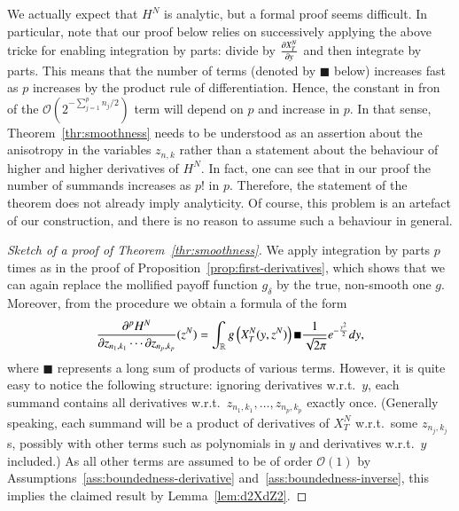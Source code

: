 \documentclass{amsart}
\begin{document}
\begin{remark}
  \label{rem:analyticity}
  We actually expect that $H^N$ is analytic, but a formal proof seems
  difficult. In particular, note that our proof below relies on successively
  applying the above tricke for enabling integration by parts: divide by
  $\frac{\partial X^N_T}{\partial y}$ and then integrate by parts. This means that the
  number of terms (denoted by $\blacksquare$ below) increases fast as $p$
  increases by the product rule of differentiation. Hence, the constant in
  fron of the $\mathcal{O}\left( 2^{-\sum_{j=1}^p n_j/2} \right)$ term will
  depend on $p$ and increase in $p$. In that sense,
  Theorem~\ref{thr:smoothness} needs to be understood as an assertion about
  the anisotropy in the variables $z_{n,k}$ rather than a statement about the
  behaviour of higher and higher derivatives of $H^N$. In fact, one can see
  that in our proof the number of summands increases as $p!$ in
  $p$. Therefore, the statement of the theorem does not already imply
  analyticity. Of course, this problem is an artefact of our construction, and
  there is no reason to assume such a behaviour in general.
\end{remark}

\begin{proof}[Sketch of a proof of Theorem~\ref{thr:smoothness}]
  We apply integration by parts $p$ times as in the proof of
  Proposition~\ref{prop:first-derivatives}, which shows that we can again
  replace the mollified payoff function $g_\delta$ by the true, non-smooth one
  $g$. Moreover, from the procedure we obtain a formula of the form
  \begin{equation*}
    \frac{\partial^p H^N}{\partial z_{n_1,k_1} \cdots \partial z_{n_p,k_p}} (z^N) = \int_{\mathbb{R}}
    g\left( X^N_T(y, z^N) \right) \blacksquare \frac{1}{\sqrt{2\pi}} e^{-\frac{y^2}{2}} dy,
  \end{equation*}
  where $\blacksquare$ represents a long sum of products of various
  terms. However, it is quite easy to notice the following structure: ignoring
  derivatives w.r.t.~$y$, each summand contains all derivatives
  w.r.t.~$z_{n_1,k_1}, \ldots, z_{n_p,k_p}$ exactly once. (Generally speaking,
  each summand will be a product of derivatives of $X^N_T$ w.r.t.~some
  $z_{n_j,k_j}$s, possibly with other terms such as polynomials in $y$ and
  derivatives w.r.t.~$y$ included.) As all other terms are assumed to be of
  order $\mathcal{O}(1)$ by Assumptions~\ref{ass:boundedness-derivative}
  and~\ref{ass:boundedness-inverse}, this implies the claimed result by
  Lemma~\ref{lem:d2XdZ2}. 
\end{proof}
\end{document}
